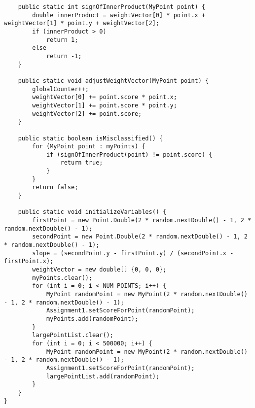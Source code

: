\documentclass{article}
\begin{document}
\begin{lstlisting}
    public static int signOfInnerProduct(MyPoint point) {
        double innerProduct = weightVector[0] * point.x + weightVector[1] * point.y + weightVector[2];
        if (innerProduct > 0)
            return 1;
        else
            return -1;
    }

    public static void adjustWeightVector(MyPoint point) {
        globalCounter++;
        weightVector[0] += point.score * point.x;
        weightVector[1] += point.score * point.y;
        weightVector[2] += point.score;
    }

    public static boolean isMisclassified() {
        for (MyPoint point : myPoints) {
            if (signOfInnerProduct(point) != point.score) {
                return true;
            }
        }
        return false;
    }

    public static void initializeVariables() {
        firstPoint = new Point.Double(2 * random.nextDouble() - 1, 2 * random.nextDouble() - 1);
        secondPoint = new Point.Double(2 * random.nextDouble() - 1, 2 * random.nextDouble() - 1);
        slope = (secondPoint.y - firstPoint.y) / (secondPoint.x - firstPoint.x);
        weightVector = new double[] {0, 0, 0};
        myPoints.clear();
        for (int i = 0; i < NUM_POINTS; i++) {
            MyPoint randomPoint = new MyPoint(2 * random.nextDouble() - 1, 2 * random.nextDouble() - 1);
            Assignment1.setScoreForPoint(randomPoint);
            myPoints.add(randomPoint);
        }
        largePointList.clear();
        for (int i = 0; i < 500000; i++) {
            MyPoint randomPoint = new MyPoint(2 * random.nextDouble() - 1, 2 * random.nextDouble() - 1);
            Assignment1.setScoreForPoint(randomPoint);
            largePointList.add(randomPoint);
        }
    }
}
\end{lstlisting}
\end{document}
